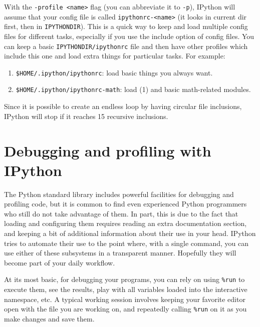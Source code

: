 With the \texttt{-profile <name>} flag (you can abbreviate it to \texttt{-p}),
IPython will assume that your config file is called \texttt{ipythonrc-<name>}
(it looks in current dir first, then in \texttt{IPYTHONDIR}). This
is a quick way to keep and load multiple config files for different
tasks, especially if you use the include option of config files. You
can keep a basic \texttt{IPYTHONDIR/ipythonrc} file and then have
other profiles which include this one and load extra things for particular
tasks. For example:

\begin{enumerate}
\item \texttt{\$HOME/.ipython/ipythonrc}: load basic things you always want. 
\item \texttt{\$HOME/.ipython/ipythonrc-math}: load (1) and basic math-related
modules. 
\end{enumerate}
Since it is possible to create an endless loop by having circular
file inclusions, IPython will stop if it reaches 15 recursive inclusions.


\section[Debugging and profiling]{Debugging and profiling with IPython }

The Python standard library includes powerful facilities for debugging
and profiling code, but it is common to find even experienced Python
programmers who still do not take advantage of them. In part, this
is due to the fact that loading and configuring them requires reading
an extra documentation section, and keeping a bit of additional information
about their use in your head. IPython tries to automate their use
to the point where, with a single command, you can use either of these
subsystems in a transparent manner. Hopefully they will become part
of your daily workflow.

At its most basic, for debugging your programs, you can rely on using
\texttt{\%run} to execute them, see the results, play with all variables
loaded into the interactive namespace, etc. A typical working session
involves keeping your favorite editor open with the file you are working
on, and repeatedly calling \texttt{\%run} on it as you make changes
and save them.

